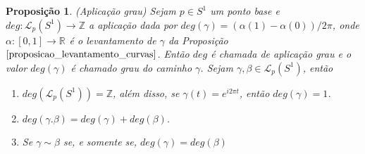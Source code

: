 \documentclass[12pt]{book}
\newtheorem{proposicao}[teorema]{Proposição}
\newcommand{\caminhos}{\mathcal{L}}
\newcommand{\caminhospontobasegeral}[2]{\caminhos_{#1}(#2)}
\newcommand{\circulo}{S^{1}}
\newcommand{\inteiros}{\mathbb{Z}}
\newcommand{\real}[1]{\mathbb{R}^{#1}}
\begin{document}
	\begin{proposicao}\label{proposicao_grau_aplicacao}
		(Aplicação grau) Sejam $p \in \circulo$ um ponto base e $deg: \caminhospontobasegeral{p}{\circulo} \to \inteiros$ a aplicação dada por $deg(\gamma) = (\alpha(1)-\alpha(0))/2\pi$, onde $\alpha:[0,1] \to \real{}$ é o levantamento de $\gamma$ da Proposição $\ref{proposicao_levantamento_curvas}$. Então $deg$ é chamada de aplicação grau e o valor $deg(\gamma)$ é chamado grau do caminho $\gamma$. Sejam $\gamma, \beta \in \caminhospontobasegeral{p}{\circulo}$, então
		\begin{enumerate}
			\item $deg(\caminhospontobasegeral{p}{\circulo}) = \inteiros$, além disso, se $\gamma(t) = e^{i2\pi t}$, então $deg(\gamma) = 1$.
			\item $deg(\gamma.\beta)=deg(\gamma)+deg(\beta)$.
			\item Se $\gamma\sim \beta$ se, e somente se, $deg(\gamma)=deg(\beta)$
		\end{enumerate}
	\end{proposicao}
\end{document}
